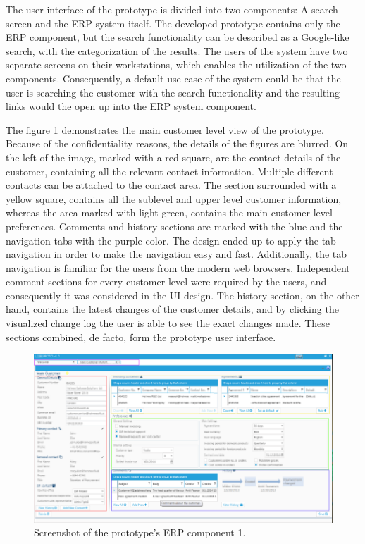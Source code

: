 \documentclass[12pt,a4paper,oneside,pdftex]{report}
\begin{document}
The user interface of the prototype is divided into two components: A search screen and the ERP system itself. The developed prototype contains only the ERP component, but the search functionality can be described as a Google-like search, with the categorization of the results. The users of the system have two separate screens on their workstations, which enables the utilization of the two components. Consequently, a default use case of the system could be that the user is searching the customer with the search functionality and the resulting links would the open up into the ERP system component. 

The figure \ref{fig:protooneimg} demonstrates the main customer level view of the prototype. Because of the confidentiality reasons, the details of the figures are blurred. On the left of the image, marked with a red square, are the contact details of the customer, containing all the relevant contact information. Multiple different contacts can be attached to the contact area. The section surrounded with a yellow square, contains all the sublevel and upper level customer information, whereas the area marked with light green, contains the main customer level preferences. Comments and history sections are marked with the blue and the navigation tabs with the purple color. The design ended up to apply the tab navigation in order to make the navigation easy and fast. Additionally, the tab navigation is familiar for the users from the modern web browsers. Independent comment sections for every customer level were required by the users, and consequently it was considered in the UI design. The history section, on the other hand, contains the latest changes of the customer details, and by clicking the visualized change log the user is able to see the exact changes made. These sections combined, de facto, form the prototype user interface.

\begin{figure}[H]

  	\centerline{
    	   \includegraphics[width=1.3\textwidth]{./images/proto_main.png}
    	   }
  	   \caption{Screenshot of the prototype's ERP component 1.}
	   \label{fig:protooneimg}
\end{figure}
\end{document}
